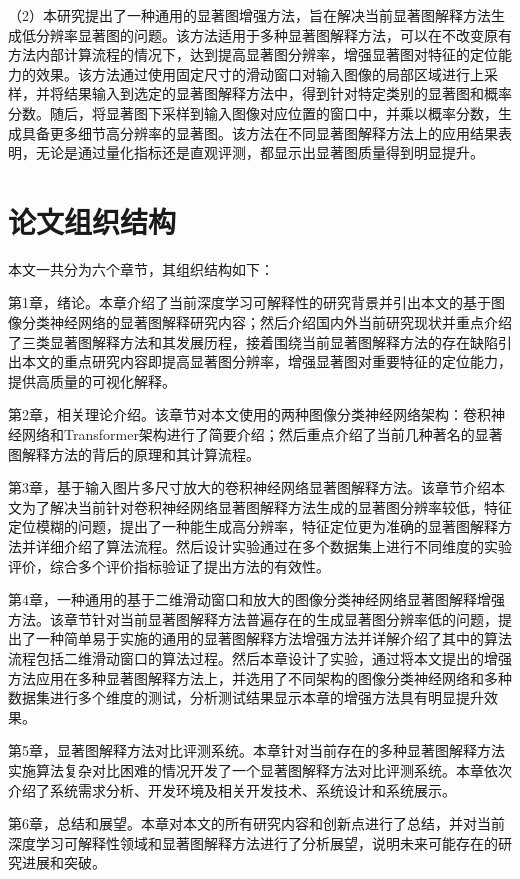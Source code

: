 （2）本研究提出了一种通用的显著图增强方法，旨在解决当前显著图解释方法生成低分辨率显著图的问题。该方法适用于多种显著图解释方法，可以在不改变原有方法内部计算流程的情况下，达到提高显著图分辨率，增强显著图对特征的定位能力的效果。该方法通过使用固定尺寸的滑动窗口对输入图像的局部区域进行上采样，并将结果输入到选定的显著图解释方法中，得到针对特定类别的显著图和概率分数。随后，将显著图下采样到输入图像对应位置的窗口中，并乘以概率分数，生成具备更多细节高分辨率的显著图。该方法在不同显著图解释方法上的应用结果表明，无论是通过量化指标还是直观评测，都显示出显著图质量得到明显提升。

\section{论文组织结构} 
本文一共分为六个章节，其组织结构如下：

第1章，绪论。本章介绍了当前深度学习可解释性的研究背景并引出本文的基于图像分类神经网络的显著图解释研究内容；然后介绍国内外当前研究现状并重点介绍了三类显著图解释方法和其发展历程，接着围绕当前显著图解释方法的存在缺陷引出本文的重点研究内容即提高显著图分辨率，增强显著图对重要特征的定位能力，提供高质量的可视化解释。

第2章，相关理论介绍。该章节对本文使用的两种图像分类神经网络架构：卷积神经网络和Transformer架构进行了简要介绍；然后重点介绍了当前几种著名的显著图解释方法的背后的原理和其计算流程。

第3章，基于输入图片多尺寸放大的卷积神经网络显著图解释方法。该章节介绍本文为了解决当前针对卷积神经网络显著图解释方法生成的显著图分辨率较低，特征定位模糊的问题，提出了一种能生成高分辨率，特征定位更为准确的显著图解释方法并详细介绍了算法流程。然后设计实验通过在多个数据集上进行不同维度的实验评价，综合多个评价指标验证了提出方法的有效性。

第4章，一种通用的基于二维滑动窗口和放大的图像分类神经网络显著图解释增强方法。该章节针对当前显著图解释方法普遍存在的生成显著图分辨率低的问题，提出了一种简单易于实施的通用的显著图解释方法增强方法并详解介绍了其中的算法流程包括二维滑动窗口的算法过程。然后本章设计了实验，通过将本文提出的增强方法应用在多种显著图解释方法上，并选用了不同架构的图像分类神经网络和多种数据集进行多个维度的测试，分析测试结果显示本章的增强方法具有明显提升效果。

第5章，显著图解释方法对比评测系统。本章针对当前存在的多种显著图解释方法实施算法复杂对比困难的情况开发了一个显著图解释方法对比评测系统。本章依次介绍了系统需求分析、开发环境及相关开发技术、系统设计和系统展示。

第6章，总结和展望。本章对本文的所有研究内容和创新点进行了总结，并对当前深度学习可解释性领域和显著图解释方法进行了分析展望，说明未来可能存在的研究进展和突破。



\clearpage